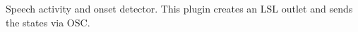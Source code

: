 Speech activity and onset detector. This plugin creates an LSL outlet
and sends the states via OSC.


